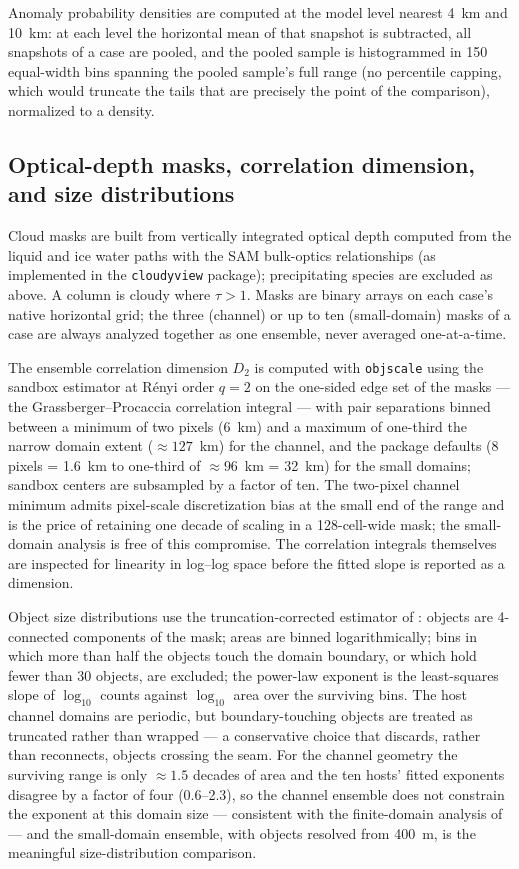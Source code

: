 Anomaly probability densities are computed at the model level nearest
4~km and 10~km: at each level the horizontal mean of that snapshot is
subtracted, all snapshots of a case are pooled, and the pooled sample is
histogrammed in 150 equal-width bins spanning the pooled sample's full
range (no percentile capping, which would truncate the tails that are
precisely the point of the comparison), normalized to a density.

\subsection{Optical-depth masks, correlation dimension, and size
distributions}
\label{sect:rcemip fractal}

Cloud masks are built from vertically integrated optical depth computed
from the liquid and ice water paths with the SAM bulk-optics
relationships (as implemented in the \texttt{cloudyview} package);
precipitating species are excluded as above. A column is cloudy where
$\tau > 1$. Masks are binary arrays on each case's native horizontal
grid; the three (channel) or up to ten (small-domain) masks of a case
are always analyzed together as one ensemble, never averaged
one-at-a-time.

The ensemble correlation dimension $D_2$ is computed with
\texttt{objscale} \citep{dewitt2026} using the sandbox estimator at
R\'enyi order $q = 2$ on the one-sided edge set of the masks --- the
Grassberger--Procaccia correlation integral --- with pair separations
binned between a minimum of two pixels (6~km) and a maximum of one-third
the narrow domain extent (${\approx}127$~km) for the channel, and the
package defaults (8 pixels = 1.6~km to one-third of ${\approx}96$~km =
32~km) for the small domains; sandbox centers are subsampled by a factor
of ten. The two-pixel channel minimum admits pixel-scale discretization
bias at the small end of the range and is the price of retaining one
decade of scaling in a 128-cell-wide mask; the small-domain analysis is
free of this compromise. The correlation integrals themselves are
inspected for linearity in log--log space before the fitted slope is
reported as a dimension.

Object size distributions use the truncation-corrected estimator of
\citet{dewitt2024}: objects are 4-connected components of the mask;
areas are binned logarithmically; bins in which more than half the
objects touch the domain boundary, or which hold fewer than 30 objects,
are excluded; the power-law exponent is the least-squares slope of
$\log_{10}$ counts against $\log_{10}$ area over the surviving bins. The
host channel domains are periodic, but boundary-touching objects are
treated as truncated rather than wrapped --- a conservative choice that
discards, rather than reconnects, objects crossing the seam. For the
channel geometry the surviving range is only ${\approx}1.5$ decades of
area and the ten hosts' fitted exponents disagree by a factor of four
(0.6--2.3), so the channel ensemble does not constrain the exponent at
this domain size --- consistent with the finite-domain analysis of
\citet{dewitt2024} --- and the small-domain ensemble, with objects
resolved from 400~m, is the meaningful size-distribution comparison.

\endinput
